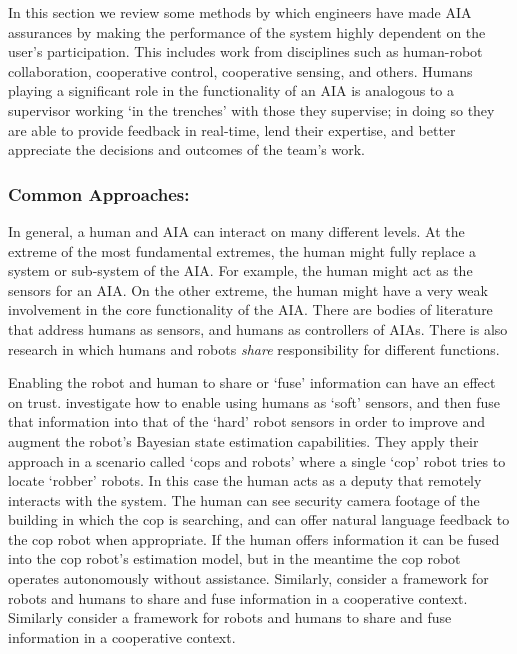 In this section we review some methods by which engineers have made AIA assurances by making the performance of the system highly dependent on the user's participation. This includes work from disciplines such as human-robot collaboration, cooperative control, cooperative sensing, and others. Humans playing a significant role in the functionality of an AIA is analogous to a supervisor working `in the trenches' with those they supervise; in doing so they are able to provide feedback in real-time, lend their expertise, and better appreciate the decisions and outcomes of the team's work.

\subsubsection{Common Approaches:}
 

In general, a human and AIA can interact on many different levels. At the extreme of the most fundamental extremes, the human might fully replace a system or sub-system of the AIA. For example, the human might act as the sensors for an AIA. On the other extreme, the human might have a very weak involvement in the core functionality of the AIA. There are bodies of literature that address humans as sensors, and humans as controllers of AIAs. There is also research in which humans and robots \emph{share} responsibility for different functions.

Enabling the robot and human to share or `fuse' information can have an effect on trust. \citet{Sweet2016-dw} investigate how to enable using humans as `soft' sensors, and then fuse that information into that of the `hard' robot sensors in order to improve and augment the robot's Bayesian state estimation capabilities. They apply their approach in a scenario called `cops and robots' where a single `cop' robot tries to locate `robber' robots. In this case the human acts as a deputy that remotely interacts with the system. The human can see security camera footage of the building in which the cop is searching, and can offer natural language feedback to the cop robot when appropriate. If the human offers information it can be fused into the cop robot's estimation model, but in the meantime the cop robot operates autonomously without assistance. Similarly, \citet{Tse2015-tz} consider a framework for robots and humans to share and fuse information in a cooperative context.
Similarly \citet{Tse2015-tz} consider a framework for robots and humans to share and fuse information in a cooperative context. 

